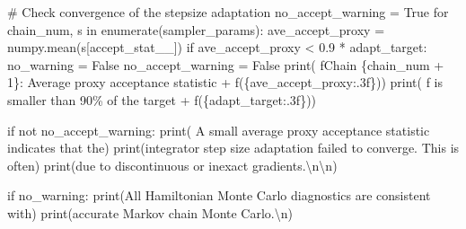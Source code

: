 \documentclass[
  letterpaper,
  DIV=11,
  numbers=noendperiod]{scrartcl}
\newenvironment{Shaded}{\begin{snugshade}}{\end{snugshade}}
\newcommand{\BuiltInTok}[1]{\textcolor[rgb]{0.00,0.23,0.31}{#1}}
\newcommand{\CharTok}[1]{\textcolor[rgb]{0.13,0.47,0.30}{#1}}
\newcommand{\CommentTok}[1]{\textcolor[rgb]{0.37,0.37,0.37}{#1}}
\newcommand{\ControlFlowTok}[1]{\textcolor[rgb]{0.00,0.23,0.31}{#1}}
\newcommand{\DecValTok}[1]{\textcolor[rgb]{0.68,0.00,0.00}{#1}}
\newcommand{\FloatTok}[1]{\textcolor[rgb]{0.68,0.00,0.00}{#1}}
\newcommand{\KeywordTok}[1]{\textcolor[rgb]{0.00,0.23,0.31}{#1}}
\newcommand{\NormalTok}[1]{\textcolor[rgb]{0.00,0.23,0.31}{#1}}
\newcommand{\OperatorTok}[1]{\textcolor[rgb]{0.37,0.37,0.37}{#1}}
\newcommand{\SpecialCharTok}[1]{\textcolor[rgb]{0.37,0.37,0.37}{#1}}
\newcommand{\SpecialStringTok}[1]{\textcolor[rgb]{0.13,0.47,0.30}{#1}}
\newcommand{\StringTok}[1]{\textcolor[rgb]{0.13,0.47,0.30}{#1}}
\newcommand{\VariableTok}[1]{\textcolor[rgb]{0.07,0.07,0.07}{#1}}
\begin{document}
\begin{Shaded}
\begin{Highlighting}[]
  \CommentTok{\# Check convergence of the stepsize adaptation}
\NormalTok{  no\_accept\_warning }\OperatorTok{=} \VariableTok{True}
  \ControlFlowTok{for}\NormalTok{ chain\_num, s }\KeywordTok{in} \BuiltInTok{enumerate}\NormalTok{(sampler\_params):}
\NormalTok{    ave\_accept\_proxy }\OperatorTok{=}\NormalTok{ numpy.mean(s[}\StringTok{\textquotesingle{}accept\_stat\_\_\textquotesingle{}}\NormalTok{])}
    \ControlFlowTok{if}\NormalTok{ ave\_accept\_proxy }\OperatorTok{\textless{}} \FloatTok{0.9} \OperatorTok{*}\NormalTok{ adapt\_target:}
\NormalTok{      no\_warning }\OperatorTok{=} \VariableTok{False}
\NormalTok{      no\_accept\_warning }\OperatorTok{=} \VariableTok{False}
      \BuiltInTok{print}\NormalTok{(  }\SpecialStringTok{f\textquotesingle{}Chain }\SpecialCharTok{\{}\NormalTok{chain\_num }\OperatorTok{+} \DecValTok{1}\SpecialCharTok{\}}\SpecialStringTok{: Average proxy acceptance statistic \textquotesingle{}}
            \OperatorTok{+} \SpecialStringTok{f\textquotesingle{}(}\SpecialCharTok{\{}\NormalTok{ave\_accept\_proxy}\SpecialCharTok{:.3f\}}\SpecialStringTok{)\textquotesingle{}}\NormalTok{)}
      \BuiltInTok{print}\NormalTok{(  }\SpecialStringTok{f\textquotesingle{}         is smaller than 90\% of the target \textquotesingle{}}
            \OperatorTok{+} \SpecialStringTok{f\textquotesingle{}(}\SpecialCharTok{\{}\NormalTok{adapt\_target}\SpecialCharTok{:.3f\}}\SpecialStringTok{)\textquotesingle{}}\NormalTok{)}
  
  \ControlFlowTok{if} \KeywordTok{not}\NormalTok{ no\_accept\_warning:}
    \BuiltInTok{print}\NormalTok{(}\StringTok{\textquotesingle{}  A small average proxy acceptance statistic indicates that the\textquotesingle{}}\NormalTok{)}
    \BuiltInTok{print}\NormalTok{(}\StringTok{\textquotesingle{}integrator step size adaptation failed to converge.  This is often\textquotesingle{}}\NormalTok{)}
    \BuiltInTok{print}\NormalTok{(}\StringTok{\textquotesingle{}due to discontinuous or inexact gradients.}\CharTok{\textbackslash{}n\textbackslash{}n}\StringTok{\textquotesingle{}}\NormalTok{)}
  
  \ControlFlowTok{if}\NormalTok{ no\_warning:}
    \BuiltInTok{print}\NormalTok{(}\StringTok{\textquotesingle{}All Hamiltonian Monte Carlo diagnostics are consistent with\textquotesingle{}}\NormalTok{)}
    \BuiltInTok{print}\NormalTok{(}\StringTok{\textquotesingle{}accurate Markov chain Monte Carlo.}\CharTok{\textbackslash{}n}\StringTok{\textquotesingle{}}\NormalTok{)}
\end{Highlighting}
\end{Shaded}
\end{document}
